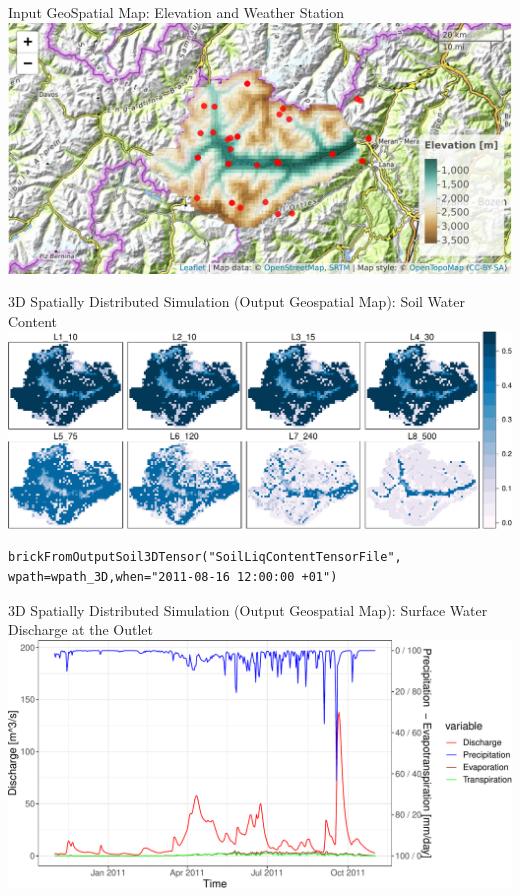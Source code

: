 \documentclass[
  ignorenonframetext,
]{beamer}
\begin{document}
\begin{frame}{Input GeoSpatial Map: Elevation and Weather Station}
\protect\hypertarget{input-geospatial-map-elevation-and-weather-station}{}
\includegraphics{presentation_files/figure-beamer/unnamed-chunk-10-1.pdf}
\end{frame}

\begin{frame}[fragile]{3D Spatially Distributed Simulation (Output
Geospatial Map): Soil Water Content}
\protect\hypertarget{d-spatially-distributed-simulation-output-geospatial-map-soil-water-content}{}
\includegraphics{presentation_files/figure-beamer/unnamed-chunk-11-1.pdf}

\begin{verbatim}
brickFromOutputSoil3DTensor("SoilLiqContentTensorFile", 
wpath=wpath_3D,when="2011-08-16 12:00:00 +01")
\end{verbatim}
\end{frame}

\begin{frame}{3D Spatially Distributed Simulation (Output Geospatial
Map): Surface Water Discharge at the Outlet}
\protect\hypertarget{d-spatially-distributed-simulation-output-geospatial-map-surface-water-discharge-at-the-outlet}{}
\includegraphics{presentation_files/figure-beamer/unnamed-chunk-13-1.pdf}
\end{frame}
\end{document}
